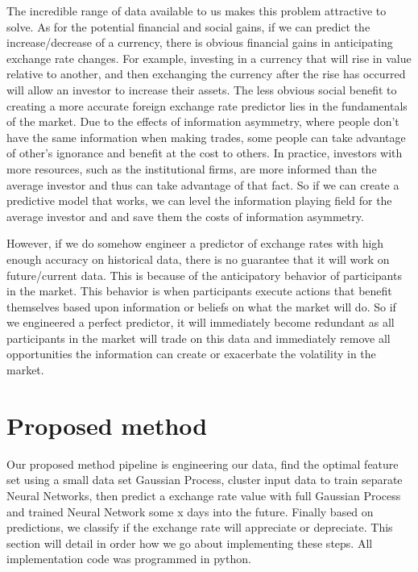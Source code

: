 \documentclass[twoside]{article}
\begin{document}
The incredible range of data available to us makes this problem attractive to solve.
As for the potential financial and social gains, if we can predict the increase/decrease of a currency, there is obvious financial gains in anticipating exchange rate changes. For example, investing in a currency that will rise in value relative to another, and then exchanging the currency after the rise has occurred will allow an investor to increase their assets. The less obvious social benefit to creating a more accurate foreign exchange rate predictor lies in the fundamentals of the market. Due to the effects of information asymmetry, where people don’t have the same information when making trades, some people can take advantage of other’s ignorance and benefit at the cost to others. In practice, investors with more resources, such as the institutional firms, are more informed than the average investor and thus can take advantage of that fact. So if we can create a predictive model that works, we can level the information playing field for the average investor and and save them the costs of information asymmetry.

However, if we do somehow engineer a predictor of exchange rates with high enough accuracy on historical data, there is no guarantee that it will work on future/current data. This is because of the anticipatory behavior of participants in the market. This behavior is when participants execute actions that benefit themselves based upon information or beliefs on what the market will do. So if we engineered a perfect predictor, it will immediately become redundant as all participants in the market will trade on this data and immediately remove all opportunities the information can create or exacerbate the volatility in the market.
 
 

\section{Proposed method}

Our proposed method pipeline is engineering our data, find the optimal feature set using a small data set Gaussian Process, cluster input data to train separate Neural Networks, then predict a exchange rate value with full Gaussian Process and trained Neural Network some x days into the future. Finally based on predictions, we classify if the exchange rate will appreciate or depreciate. This section will detail in order how we go about implementing these steps. All implementation code was programmed in python.
\end{document}

